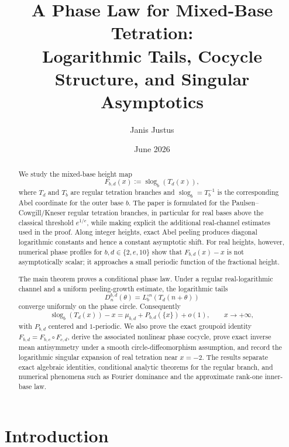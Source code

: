 \documentclass[11pt,a4paper]{article}
\title{A Phase Law for Mixed-Base Tetration:\\Logarithmic Tails, Cocycle Structure, and Singular Asymptotics}
\author{Janis Justus}
\date{June 2026}
\theoremstyle{plain}
\theoremstyle{definition}
\theoremstyle{remark}
\newcommand{\slog}{\operatorname{slog}}
\begin{document}
\maketitle

\begin{abstract}
We study the mixed-base height map
\[
  F_{b,d}(x):=\slog_b(T_d(x)),
\]
where $T_d$ and $T_b$ are regular tetration branches and $\slog_b=T_b^{-1}$ is the corresponding Abel coordinate for the outer base $b$.  The paper is formulated for the Paulsen--Cowgill/Kneser regular tetration branches, in particular for real bases above the classical threshold $e^{1/e}$, while making explicit the additional real-channel estimates used in the proof.  Along integer heights, exact Abel peeling produces diagonal logarithmic constants and hence a constant asymptotic shift.  For real heights, however, numerical phase profiles for $b,d\in\{2,e,10\}$ show that $F_{b,d}(x)-x$ is not asymptotically scalar; it approaches a small periodic function of the fractional height.

The main theorem proves a conditional phase law.  Under a regular real-logarithmic channel and a uniform peeling-growth estimate, the logarithmic tails
\[
  D_n^{b,d}(\theta)=L_b^{\circ n}(T_d(n+\theta))
\]
converge uniformly on the phase circle.  Consequently
\[
  \slog_b(T_d(x))-x=\mu_{b,d}+P_{b,d}(\{x\})+o(1),\qquad x\to+\infty,
\]
with $P_{b,d}$ centered and $1$-periodic.  We also prove the exact groupoid identity $F_{b,d}=F_{b,c}\circ F_{c,d}$, derive the associated nonlinear phase cocycle, prove exact inverse mean antisymmetry under a smooth circle-diffeomorphism assumption, and record the logarithmic singular expansion of real tetration near $x=-2$.  The results separate exact algebraic identities, conditional analytic theorems for the regular branch, and numerical phenomena such as Fourier dominance and the approximate rank-one inner-base law.
\end{abstract}


\section{Introduction}
\end{document}
